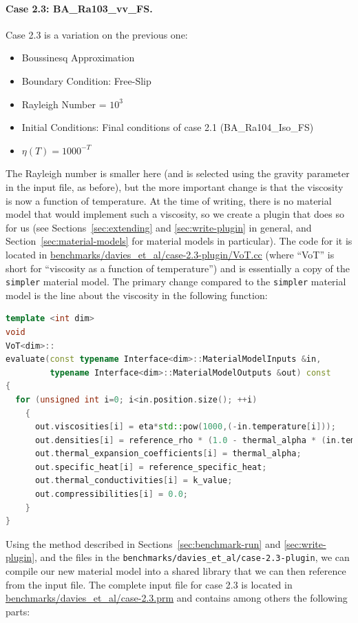 \documentclass{article}
\begin{document}
\paragraph{Case 2.3: BA\_Ra103\_vv\_FS.}
\label{sec:davies-case23_BA}

Case 2.3 is a variation on the previous one:
\begin{itemize}
\item Boussinesq Approximation
\item Boundary Condition: Free-Slip
\item Rayleigh Number = $10^3$ 
\item Initial Conditions: Final conditions of case 2.1 (BA\_Ra104\_Iso\_FS)
\item $\eta(T) = 1000^{-T}$
\end{itemize}
The Rayleigh number is smaller here (and is selected using the gravity
parameter in the input file, as before), but the more important change is that the
viscosity is now a function of temperature. At the time of writing, there is
no material model that would implement such a viscosity, so we
create a plugin that does so for us (see Sections~\ref{sec:extending} and
\ref{sec:write-plugin} in
general, and Section~\ref{sec:material-models} for material models in
particular). The code for it is located in 
\url{benchmarks/davies_et_al/case-2.3-plugin/VoT.cc} (where ``VoT'' is short
for ``viscosity as a function of temperature'') and is essentially a copy of
the \texttt{simpler} material model. The primary change compared to the 
\texttt{simpler} material model is the line about the viscosity in the
following function:
\begin{lstlisting}[frame=single,language=C++]
template <int dim>
void
VoT<dim>::
evaluate(const typename Interface<dim>::MaterialModelInputs &in,
         typename Interface<dim>::MaterialModelOutputs &out) const
{
  for (unsigned int i=0; i<in.position.size(); ++i)
    {
      out.viscosities[i] = eta*std::pow(1000,(-in.temperature[i]));
      out.densities[i] = reference_rho * (1.0 - thermal_alpha * (in.temperature[i] - reference_T));
      out.thermal_expansion_coefficients[i] = thermal_alpha;
      out.specific_heat[i] = reference_specific_heat;
      out.thermal_conductivities[i] = k_value;
      out.compressibilities[i] = 0.0;
    }
}
\end{lstlisting}
Using the method described in Sections~\ref{sec:benchmark-run} and
\ref{sec:write-plugin}, and the files in 
the \texttt{benchmarks/davies\_et\_al/case-2.3-plugin}, we can compile our new
material model into a shared library that we can then reference from the input file.
The complete input file for case 2.3 is located in
\url{benchmarks/davies_et_al/case-2.3.prm} and contains among others the
following parts:
\end{document}
